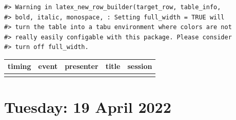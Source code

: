 \documentclass[
]{book}
\begin{document}
\begin{verbatim}
#> Warning in latex_new_row_builder(target_row, table_info,
#> bold, italic, monospace, : Setting full_width = TRUE will
#> turn the table into a tabu environment where colors are not
#> really easily configable with this package. Please consider
#> turn off full_width.
\end{verbatim}

\begin{tabu} to 
\hline
timing & event & presenter & title & session\\
\hline
{} &  &  &  & \\
\hline
\end{tabu}

\hypertarget{tuesday-19-april-2022}{%
\section*{Tuesday: 19 April 2022}\label{tuesday-19-april-2022}}
\end{document}
